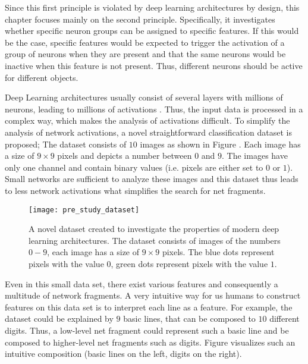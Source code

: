 Since this first principle is violated by deep learning architectures by design, this chapter focuses mainly on the second principle. Specifically, it investigates whether specific neuron groups can be assigned to specific features. 
If this would be the case, specific features would be expected to trigger the activation of a group of neurons when they are present and that the same neurons would be inactive when this feature is not present. Thus, different neurons should be active for different objects.


Deep Learning architectures usually consist of several layers with millions of neurons, leading to millions of activations \cite{Szegedy_Liu_Jia_Sermanet_Reed_Anguelov_Erhan_Vanhoucke_Rabinovich_2014, He_Zhang_Ren_Sun_2016, Ronneberger_Fischer_Brox_2015, He_Gkioxari_Dollar_Girshick_2017, Liu_Anguelov_Erhan_Szegedy_Reed_Fu_Berg_2016, Redmon_Divvala_Girshick_Farhadi_2016}.
Thus, the input data is processed in a complex way, which makes the analysis of activations difficult.
To simplify the analysis of network activations, a novel straightforward classification dataset is proposed;
The dataset consists of $10$ images as shown in Figure .
Each image has a size of $9\times9$ pixels and depicts a number between $0$ and $9$.
The images have only one channel and contain binary values (i.e. pixels are either set to $0$ or $1$).
Small networks are sufficient to analyze these images and this dataset thus leads to less network activations what simplifies the search for net fragments.

\begin{figure}[h]
    \centering
    \texttt{[image: pre\_study\_dataset]}
    \caption[Straight Line Digits Dataset]{A novel dataset created to investigate the properties of modern deep learning architectures. The dataset consists of images of the numbers $0-9$, each image has a size of $9\times9$ pixels. The blue dots represent pixels with the value $0$, green dots represent pixels with the value $1$.}
\end{figure}

Even in this small data set, there exist various features and consequently a multitude of network fragments.
A very intuitive way for us humans to construct features on this data set is to interpret each line as a feature.
For example, the dataset could be explained by $9$ basic lines, that can be composed to $10$ different digits.
Thus, a low-level net fragment could represent such a basic line and be composed to higher-level net fragments such as digits.
Figure  visualizes such an intuitive composition (basic lines on the left, digits on the right).

